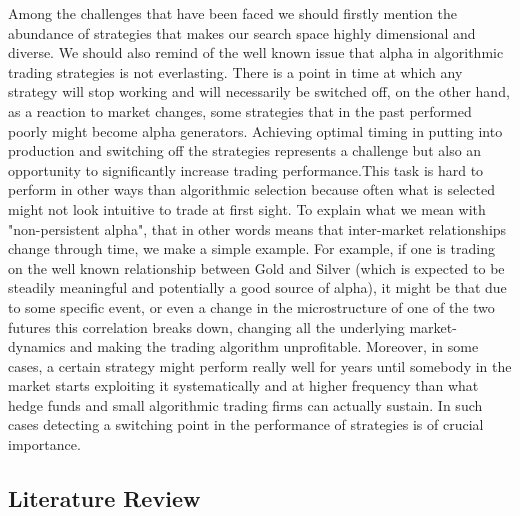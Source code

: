 \documentclass[12pt]{article} %
\numberwithin{equation}{subsection}
\begin{document}
Among the challenges that have been faced we should firstly mention the abundance of strategies that makes our search space highly dimensional and diverse. We should also remind of the well known issue that alpha in algorithmic trading strategies is not everlasting. There is a point in time at which any strategy will stop working and will necessarily be switched off, on the other hand, as a reaction to market changes, some strategies that in the past performed poorly might become alpha generators. Achieving optimal timing in putting into production and switching off the strategies represents a challenge but also an opportunity to significantly increase trading performance.This task is hard to perform in other ways than algorithmic selection because often what is selected might not look intuitive to trade at first sight. To explain what we mean with "non-persistent alpha", that in other words means that inter-market relationships change through time, we make a simple example. For example, if one is trading on the well known relationship between Gold and Silver (which is expected to be steadily meaningful and potentially a good source of alpha), it might be that due to some specific event, or even a change in the microstructure of one of the two futures this correlation breaks down, changing all the underlying market-dynamics and making the trading algorithm unprofitable. Moreover, in some cases, a certain strategy might perform really well for years until somebody in the market starts exploiting it systematically and at higher frequency than what hedge funds and small algorithmic trading firms can actually sustain. In such cases detecting a switching point in the performance of strategies is of crucial importance.\\







\subsection{Literature Review}
\end{document}
